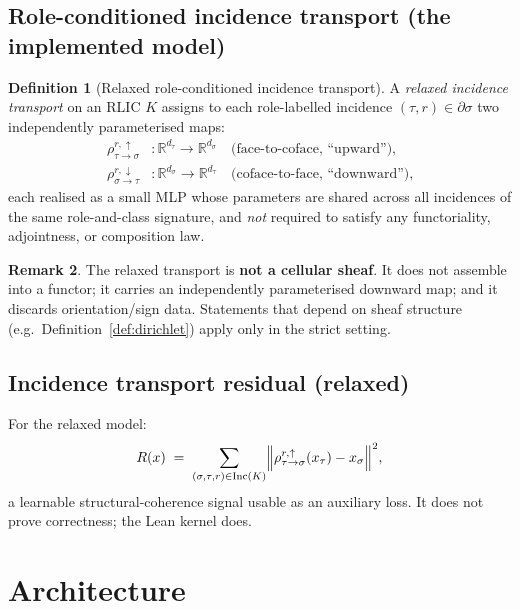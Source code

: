 \documentclass[11pt]{article}
\theoremstyle{definition}
\newtheorem{definition}{Definition}[section]
\newtheorem{remark}[definition]{Remark}
\theoremstyle{plain}
\newcommand{\R}{\mathbb{R}}
\newcommand{\Inc}{\mathrm{Inc}}
\begin{document}
\subsection{Role-conditioned incidence transport (the implemented model)}

\begin{definition}[Relaxed role-conditioned incidence transport]\label{def:transport}
A \emph{relaxed incidence transport} on an RLIC $K$ assigns to each role-labelled incidence $(\tau, r) \in \partial \sigma$ two independently parameterised maps:
\begin{align*}
\rho^{r,\uparrow}_{\tau \to \sigma} &\colon \R^{d_\tau} \to \R^{d_\sigma} \quad\text{(face-to-coface, ``upward''),}\\
\rho^{r,\downarrow}_{\sigma \to \tau} &\colon \R^{d_\sigma} \to \R^{d_\tau} \quad\text{(coface-to-face, ``downward''),}
\end{align*}
each realised as a small MLP whose parameters are shared across all incidences of the same role-and-class signature, and \emph{not} required to satisfy any functoriality, adjointness, or composition law.
\end{definition}

\begin{remark}\label{rem:not-sheaf}
The relaxed transport is \textbf{not a cellular sheaf}. It does not assemble into a functor; it carries an independently parameterised downward map; and it discards orientation/sign data. Statements that depend on sheaf structure (e.g.\ Definition~\ref{def:dirichlet}) apply only in the strict setting.
\end{remark}

\subsection{Incidence transport residual (relaxed)}

For the relaxed model:
\[
R(x) \;=\; \sum_{(\sigma, \tau, r)\in \Inc(K)} \Bigl\lVert \rho^{r,\uparrow}_{\tau \to \sigma}(x_\tau) - x_\sigma \Bigr\rVert^2,
\]
a learnable structural-coherence signal usable as an auxiliary loss. It does not prove correctness; the Lean kernel does.

\section{Architecture}\label{sec:arch}
\end{document}
